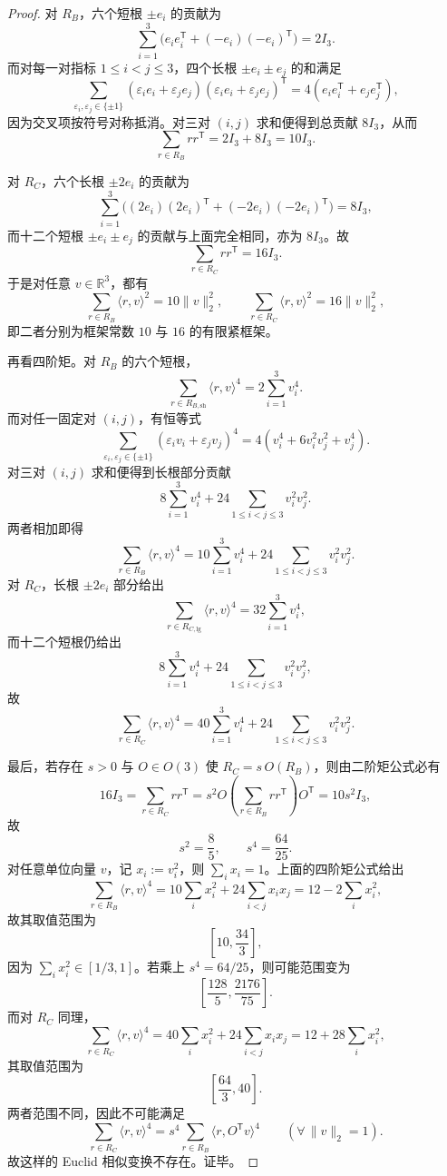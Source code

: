 \begin{proof}
对 \(R_B\)，六个短根 \(\pm e_i\) 的贡献为
\[
\sum_{i=1}^3\bigl(e_ie_i^{\mathsf T}+(-e_i)(-e_i)^{\mathsf T}\bigr)=2I_3.
\]
而对每一对指标 \(1\le i<j\le 3\)，四个长根 \(\pm e_i\pm e_j\) 的和满足
\[
\sum_{\varepsilon_i,\varepsilon_j\in\{\pm1\}}
(\varepsilon_i e_i+\varepsilon_j e_j)(\varepsilon_i e_i+\varepsilon_j e_j)^{\mathsf T}
=
4(e_ie_i^{\mathsf T}+e_je_j^{\mathsf T}),
\]
因为交叉项按符号对称抵消。对三对 \((i,j)\) 求和便得到总贡献 \(8I_3\)，从而
\[
\sum_{r\in R_B}rr^{\mathsf T}=2I_3+8I_3=10I_3.
\]

对 \(R_C\)，六个长根 \(\pm2e_i\) 的贡献为
\[
\sum_{i=1}^3\bigl((2e_i)(2e_i)^{\mathsf T}+(-2e_i)(-2e_i)^{\mathsf T}\bigr)=8I_3,
\]
而十二个短根 \(\pm e_i\pm e_j\) 的贡献与上面完全相同，亦为 \(8I_3\)。故
\[
\sum_{r\in R_C}rr^{\mathsf T}=16I_3.
\]
于是对任意 \(v\in\mathbb R^3\)，都有
\[
\sum_{r\in R_B}\langle r,v\rangle^2=10\|v\|_2^2,
\qquad
\sum_{r\in R_C}\langle r,v\rangle^2=16\|v\|_2^2,
\]
即二者分别为框架常数 \(10\) 与 \(16\) 的有限紧框架。

再看四阶矩。对 \(R_B\) 的六个短根，
\[
\sum_{r\in R_{B,\mathrm{sh}}}\langle r,v\rangle^4=2\sum_{i=1}^3 v_i^4.
\]
而对任一固定对 \((i,j)\)，有恒等式
\[
\sum_{\varepsilon_i,\varepsilon_j\in\{\pm1\}}
(\varepsilon_i v_i+\varepsilon_j v_j)^4
=
4(v_i^4+6v_i^2v_j^2+v_j^4).
\]
对三对 \((i,j)\) 求和便得到长根部分贡献
\[
8\sum_{i=1}^3 v_i^4+24\sum_{1\le i<j\le 3}v_i^2v_j^2.
\]
两者相加即得
\[
\sum_{r\in R_B}\langle r,v\rangle^4
=
10\sum_{i=1}^3 v_i^4+24\sum_{1\le i<j\le 3}v_i^2v_j^2.
\]
对 \(R_C\)，长根 \(\pm 2e_i\) 部分给出
\[
\sum_{r\in R_{C,\mathrm{lg}}}\langle r,v\rangle^4=32\sum_{i=1}^3 v_i^4,
\]
而十二个短根仍给出
\[
8\sum_{i=1}^3 v_i^4+24\sum_{1\le i<j\le 3}v_i^2v_j^2,
\]
故
\[
\sum_{r\in R_C}\langle r,v\rangle^4
=
40\sum_{i=1}^3 v_i^4+24\sum_{1\le i<j\le 3}v_i^2v_j^2.
\]

最后，若存在 \(s>0\) 与 \(O\in O(3)\) 使 \(R_C=s\,O(R_B)\)，则由二阶矩公式必有
\[
16I_3
=
\sum_{r\in R_C}rr^{\mathsf T}
=
s^2 O\left(\sum_{r\in R_B}rr^{\mathsf T}\right)O^{\mathsf T}
=
10s^2I_3,
\]
故
\[
s^2=\frac85,
\qquad
s^4=\frac{64}{25}.
\]
对任意单位向量 \(v\)，记 \(x_i:=v_i^2\)，则 \(\sum_i x_i=1\)。上面的四阶矩公式给出
\[
\sum_{r\in R_B}\langle r,v\rangle^4
=
10\sum_i x_i^2+24\sum_{i<j}x_ix_j
=
12-2\sum_i x_i^2,
\]
故其取值范围为
\[
\left[10,\frac{34}{3}\right],
\]
因为 \(\sum_i x_i^2\in[1/3,1]\)。若乘上 \(s^4=64/25\)，则可能范围变为
\[
\left[\frac{128}{5},\frac{2176}{75}\right].
\]
而对 \(R_C\) 同理，
\[
\sum_{r\in R_C}\langle r,v\rangle^4
=
40\sum_i x_i^2+24\sum_{i<j}x_ix_j
=
12+28\sum_i x_i^2,
\]
其取值范围为
\[
\left[\frac{64}{3},40\right].
\]
两者范围不同，因此不可能满足
\[
\sum_{r\in R_C}\langle r,v\rangle^4
=
s^4\sum_{r\in R_B}\langle r,O^{\mathsf T}v\rangle^4
\qquad(\forall\,\|v\|_2=1).
\]
故这样的 Euclid 相似变换不存在。证毕。
\end{proof}

